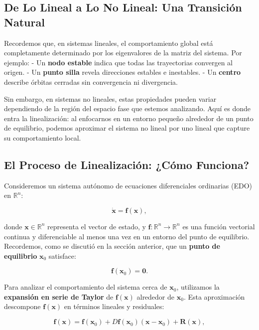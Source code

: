 \subsection{De Lo Lineal a Lo No Lineal: Una Transición Natural}

Recordemos que, en sistemas lineales, el comportamiento global está completamente determinado por los eigenvalores de la matriz del sistema. Por ejemplo:
- Un \textbf{nodo estable} indica que todas las trayectorias convergen al origen.
- Un \textbf{punto silla} revela direcciones estables e inestables.
- Un \textbf{centro} describe órbitas cerradas sin convergencia ni divergencia.

Sin embargo, en sistemas no lineales, estas propiedades pueden variar dependiendo de la región del espacio fase que estemos analizando. Aquí es donde entra la linealización: al enfocarnos en un entorno pequeño alrededor de un punto de equilibrio, podemos aproximar el sistema no lineal por uno lineal que capture su comportamiento local.

\subsection{El Proceso de Linealización: ¿Cómo Funciona?}

Consideremos un sistema autónomo de ecuaciones diferenciales ordinarias (EDO) en $\mathbb{R}^n$:

\begin{equation}\label{eq:sistema_no_lineal}
    \dot{\mathbf{x}} = \mathbf{f}(\mathbf{x}),
\end{equation}

donde $\mathbf{x} \in \mathbb{R}^n$ representa el vector de estado, y $\mathbf{f}: \mathbb{R}^n \to \mathbb{R}^n$ es una función vectorial continua y diferenciable al menos una vez en un entorno del punto de equilibrio. Recordemos, como se discutió en la sección anterior, que un \textbf{punto de equilibrio} $\mathbf{x}_0$ satisface:

\begin{equation}
    \mathbf{f}(\mathbf{x}_0) = \mathbf{0}.
\end{equation}

Para analizar el comportamiento del sistema cerca de $\mathbf{x}_0$, utilizamos la \textbf{expansión en serie de Taylor} de $\mathbf{f}(\mathbf{x})$ alrededor de $\mathbf{x}_0$. Esta aproximación descompone $\mathbf{f}(\mathbf{x})$ en términos lineales y residuales:

\begin{equation}
    \mathbf{f}(\mathbf{x}) = \mathbf{f}(\mathbf{x}_0) + D\mathbf{f}(\mathbf{x}_0)(\mathbf{x} - \mathbf{x}_0) + \mathbf{R}(\mathbf{x}),
\end{equation}

